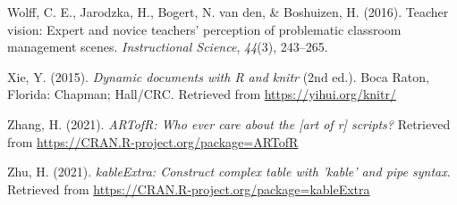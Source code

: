 \documentclass[
  man]{apa6}
\newlength{\cslhangindent}
\newenvironment{CSLReferences}[2] %
 {\begin{list}{}{%
  \setlength{\itemindent}{0pt}
  \setlength{\leftmargin}{0pt}
  \setlength{\parsep}{0pt}
  \ifodd #1
   \setlength{\leftmargin}{\cslhangindent}
   \setlength{\itemindent}{-1\cslhangindent}
  \fi
  \setlength{\itemsep}{#2\baselineskip}}}
 {\end{list}}
\begin{document}
\begin{CSLReferences}{1}{0}
Wolff, C. E., Jarodzka, H., Bogert, N. van den, \& Boshuizen, H. (2016). Teacher vision: Expert and novice teachers' perception of problematic classroom management scenes. \emph{Instructional Science}, \emph{44}(3), 243--265.

Xie, Y. (2015). \emph{Dynamic documents with {R} and knitr} (2nd ed.). Boca Raton, Florida: Chapman; Hall/CRC. Retrieved from \url{https://yihui.org/knitr/}

Zhang, H. (2021). \emph{ARTofR: Who ever care about the {[}art of r{]} scripts?} Retrieved from \url{https://CRAN.R-project.org/package=ARTofR}

Zhu, H. (2021). \emph{kableExtra: Construct complex table with 'kable' and pipe syntax}. Retrieved from \url{https://CRAN.R-project.org/package=kableExtra}

\end{CSLReferences}

\endgroup


\clearpage
\renewcommand{\listtablename}{Table captions}
\end{document}
